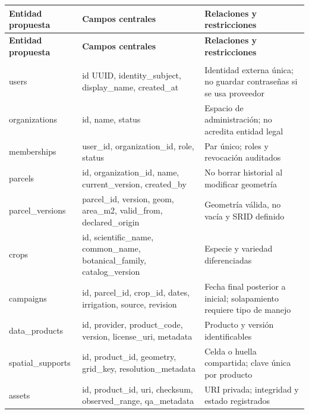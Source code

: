 \documentclass[10pt,a4paper]{article}
\begin{document}
\begingroup\small
\begin{longtable}{>{\raggedright\arraybackslash}p{3.647cm}>{\raggedright\arraybackslash}p{5.867cm}>{\raggedright\arraybackslash}p{6.343cm}}
\toprule
\textbf{Entidad propuesta} & \textbf{Campos centrales} & \textbf{Relaciones y restricciones} \\
\midrule\endfirsthead
\toprule
\textbf{Entidad propuesta} & \textbf{Campos centrales} & \textbf{Relaciones y restricciones} \\
\midrule\endhead
\midrule\multicolumn{3}{r}{\scriptsize Continúa en la página siguiente}\\\endfoot
\bottomrule\endlastfoot
users & id UUID, identity\_\allowbreak{}subject, display\_\allowbreak{}name, created\_\allowbreak{}at & Identidad externa única; no guardar contraseñas si se usa proveedor \\[3pt]
organizations & id, name, status & Espacio de administración; no acredita entidad legal \\[3pt]
memberships & user\_\allowbreak{}id, organization\_\allowbreak{}id, role, status & Par único; roles y revocación auditados \\[3pt]
parcels & id, organization\_\allowbreak{}id, name, current\_\allowbreak{}version, created\_\allowbreak{}by & No borrar historial al modificar geometría \\[3pt]
parcel\_\allowbreak{}versions & parcel\_\allowbreak{}id, version, geom, area\_\allowbreak{}m2, valid\_\allowbreak{}from, declared\_\allowbreak{}origin & Geometría válida, no vacía y SRID definido \\[3pt]
crops & id, scientific\_\allowbreak{}name, common\_\allowbreak{}name, botanical\_\allowbreak{}family, catalog\_\allowbreak{}version & Especie y variedad diferenciadas \\[3pt]
campaigns & id, parcel\_\allowbreak{}id, crop\_\allowbreak{}id, dates, irrigation, source, revision & Fecha final posterior a inicial; solapamiento requiere tipo de manejo \\[3pt]
data\_\allowbreak{}products & id, provider, product\_\allowbreak{}code, version, license\_\allowbreak{}uri, metadata & Producto y versión identificables \\[3pt]
spatial\_\allowbreak{}supports & id, product\_\allowbreak{}id, geometry, grid\_\allowbreak{}key, resolution\_\allowbreak{}metadata & Celda o huella compartida; clave única por producto \\[3pt]
assets & id, product\_\allowbreak{}id, uri, checksum, observed\_\allowbreak{}range, qa\_\allowbreak{}metadata & URI privada; integridad y estado registrados \\[3pt]

\end{longtable}
\end{document}
